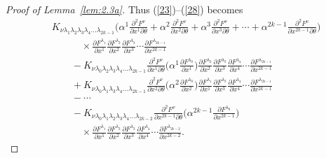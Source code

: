 \documentclass[pdftex]{sigma}
\numberwithin{equation}{section}
\theoremstyle{definition}
\begin{document}
\begin{proof}[Proof of Lemma~\ref{lem:2.3a}]
Thus (\ref{23})--(\ref{28}) becomes
\begin{align}
&K_{\nu\lambda_1\lambda_2\lambda_3\lambda_4\dots\lambda_{2k-1}}\biggl(\alpha^1 \frac{\partial^2F^\nu}{\partial x^1\partial\theta}+ \alpha^2 \frac{\partial^2F^\nu}{\partial x^2\partial\theta}
+\alpha^3 \frac{\partial^2F^\nu}{\partial x^3\partial\theta} +\cdots
+\alpha^{2k-1} \frac{\partial^2F^\nu}{\partial x^{2k-1}\partial\theta}
\biggr)\nonumber\\
&\quad\qquad{} \times \frac{\partial F^{\lambda_1}}{\partial x^1}\frac{\partial F^{\lambda_2}}{\partial x^2}
\frac{\partial F^{\lambda_3}}{\partial x^3}
\cdots\frac{\partial F^{\lambda_{2k-1}}}{\partial x^{2k-1}}\label{29}\\
&\qquad{}-K_{\nu\lambda_0\lambda_2\lambda_3\lambda_4\dots \lambda_{2k-1}}\frac{\partial^2F^\nu}{\partial x^1\partial\theta}
\biggl( \alpha^1\frac{\partial F^{\lambda_0}}{\partial x^1}\biggr)
\frac{\partial F^{\lambda_2}}{\partial x^2}
\frac{\partial F^{\lambda_3}}{\partial x^3}\frac{\partial F^{\lambda_4}}{\partial x^4}\cdots
\frac{\partial F^{\lambda_{2k-1}}}{\partial x^{2k-1}}
\label{30}\\
&\qquad{} + K_{\nu\lambda_0\lambda_1\lambda_3\lambda_4\dots\lambda_{2k-1}}\frac{\partial^2F^\nu}{\partial x^2\partial\theta}
\biggl( \alpha^2\frac{\partial F^{\lambda_0}}{\partial x^2}\biggr)
\frac{\partial F^{\lambda_1}}{\partial x^1}\frac{\partial F^{\lambda_3}}{\partial x^3}
\frac{\partial F^{\lambda_4}}{\partial x^4}\cdots \frac{\partial F^{\lambda_{2k-1}}}{\partial x^{2k-1}}
\label{31}\\
&\qquad -\cdots\nonumber\\
&\qquad{} - K_{\nu\lambda_0\lambda_1\lambda_2\lambda_3\lambda_4\dots\lambda_{2k-2}}\frac{\partial^2F^\nu}{\partial x^{2k-1}\partial\theta}
\biggl( \alpha^{2k-1}\frac{\partial F^{\lambda_0}}{\partial x^{2k-1}}\biggr)\nonumber\\
&\quad\qquad{}\times
\frac{\partial F^{\lambda_1}}{\partial x^1}\frac{\partial F^{\lambda_2}}{\partial x^2}
\frac{\partial F^{\lambda_3}}{\partial x^3}\frac{\partial F^{\lambda_4}}{\partial x^4}\cdots
\frac{\partial F^{\lambda_{2k-2}}}{\partial x^{2k-2}}.
\label{34}
\end{align}


\end{proof}
\end{document}
